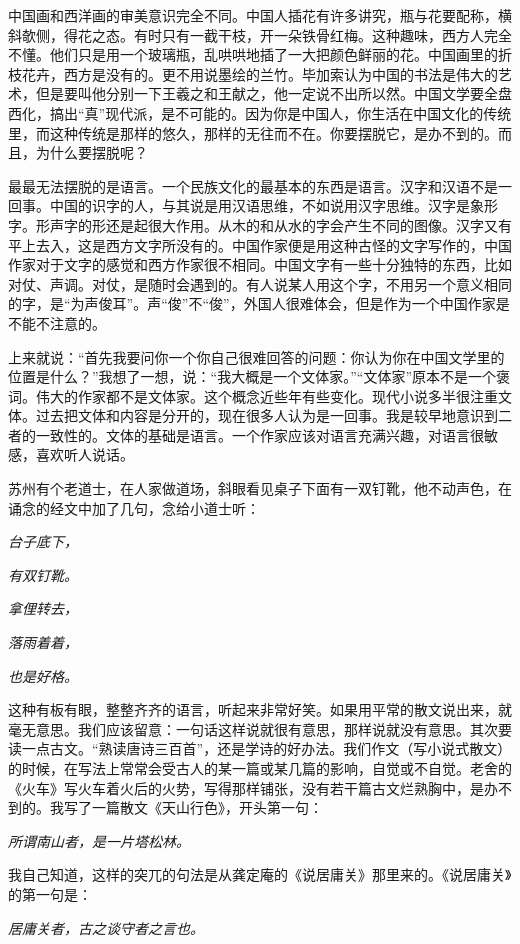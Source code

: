 \documentclass[12pt,a5paper]{ctexbook}
\begin{document}
中国画和西洋画的审美意识完全不同。中国人插花有许多讲究，瓶与花要配称，横斜欹侧，得花之态。有时只有一截干枝，开一朵铁骨红梅。这种趣味，西方人完全不懂。他们只是用一个玻璃瓶，乱哄哄地插了一大把颜色鲜丽的花。中国画里的折枝花卉，西方是没有的。更不用说墨绘的兰竹。毕加索认为中国的书法是伟大的艺术，但是要叫他分别一下王羲之和王献之，他一定说不出所以然。中国文学要全盘西化，搞出“真”现代派，是不可能的。因为你是中国人，你生活在中国文化的传统里，而这种传统是那样的悠久，那样的无往而不在。你要摆脱它，是办不到的。而且，为什么要摆脱呢？

最最无法摆脱的是语言。一个民族文化的最基本的东西是语言。汉字和汉语不是一回事。中国的识字的人，与其说是用汉语思维，不如说用汉字思维。汉字是象形字。形声字的形还是起很大作用。从木的和从水的字会产生不同的图像。汉字又有平上去入，这是西方文字所没有的。中国作家便是用这种古怪的文字写作的，中国作家对于文字的感觉和西方作家很不相同。中国文字有一些十分独特的东西，比如对仗、声调。对仗，是随时会遇到的。有人说某人用这个字，不用另一个意义相同的字，是“为声俊耳”。声“俊”不“俊”，外国人很难体会，但是作为一个中国作家是不能不注意的。

上来就说：“首先我要问你一个你自己很难回答的问题：你认为你在中国文学里的位置是什么？”我想了一想，说：“我大概是一个文体家。”“文体家”原本不是一个褒词。伟大的作家都不是文体家。这个概念近些年有些变化。现代小说多半很注重文体。过去把文体和内容是分开的，现在很多人认为是一回事。我是较早地意识到二者的一致性的。文体的基础是语言。一个作家应该对语言充满兴趣，对语言很敏感，喜欢听人说话。

苏州有个老道士，在人家做道场，斜眼看见桌子下面有一双钉靴，他不动声色，在诵念的经文中加了几句，念给小道士听：

\centerline{\emph{台子底下，}}
\centerline{\emph{有双钉靴。}}
\centerline{\emph{拿俚转去，}}
\centerline{\emph{落雨着着，}}
\centerline{\emph{也是好格。}}

这种有板有眼，整整齐齐的语言，听起来非常好笑。如果用平常的散文说出来，就毫无意思。我们应该留意：一句话这样说就很有意思，那样说就没有意思。其次要读一点古文。“熟读唐诗三百首”，还是学诗的好办法。我们作文（写小说式散文）的时候，在写法上常常会受古人的某一篇或某几篇的影响，自觉或不自觉。老舍的《火车》写火车着火后的火势，写得那样铺张，没有若干篇古文烂熟胸中，是办不到的。我写了一篇散文《天山行色》，开头第一句：

\centerline{\emph{所谓南山者，是一片塔松林。}}

我自己知道，这样的突兀的句法是从龚定庵的《说居庸关》那里来的。《说居庸关》的第一句是：

\centerline{\emph{居庸关者，古之谈守者之言也。}}
\end{document}

